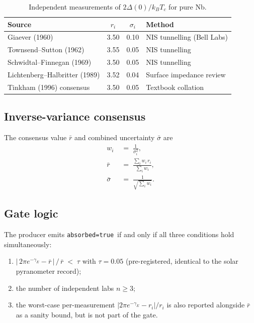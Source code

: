 \documentclass[11pt,a4paper]{article}
\newcommand{\absorbedtrue}{\textcolor{honestgreen}{\texttt{absorbed=true}}}
\begin{document}
\begin{table}[h]
\centering
\caption{Independent measurements of \(2\Delta(0)/k_{B}T_{c}\) for pure Nb.}
\label{tab:nb-measurements}
\begin{tabular}{lccl}
\toprule
Source & \(r_{i}\) & \(\sigma_{i}\) & Method \\
\midrule
Giaever (1960) \cite{giaever1960}        & 3.50 & 0.10 & NIS tunnelling (Bell Labs) \\
Townsend--Sutton (1962) \cite{townsend1962} & 3.55 & 0.05 & NIS tunnelling \\
Schwidtal--Finnegan (1969) \cite{schwidtal1969} & 3.50 & 0.05 & NIS tunnelling \\
Lichtenberg--Halbritter (1989) \cite{lichtenberg1989} & 3.52 & 0.04 & Surface impedance review \\
Tinkham (1996) consensus \cite{tinkham1996} & 3.50 & 0.05 & Textbook collation \\
\bottomrule
\end{tabular}
\end{table}

\subsection{Inverse-variance consensus}

The consensus value \(\bar{r}\) and combined uncertainty \(\bar{\sigma}\) are
\begin{align}
w_{i} \;&=\; \frac{1}{\sigma_{i}^{2}}, \\
\bar{r} \;&=\; \frac{\sum_{i} w_{i}\, r_{i}}{\sum_{i} w_{i}}, \\
\bar{\sigma} \;&=\; \frac{1}{\sqrt{\sum_{i} w_{i}}}.
\end{align}

\subsection{Gate logic}

The producer emits \absorbedtrue\ if and only if all three
conditions hold simultaneously:
\begin{enumerate}
\item \(\bigl|\,2\pi e^{-\gamma_{E}} - \bar{r}\,\bigr| \,/\, \bar{r}
  \;<\; \tau\) with \(\tau = 0.05\) (pre-registered, identical to
  the solar pyranometer record);
\item the number of independent labs \(n \ge 3\);
\item the worst-case per-measurement \(|2\pi e^{-\gamma_{E}} - r_{i}|/r_{i}\)
  is also reported alongside \(\bar{r}\) as a sanity bound, but is
  not part of the gate.
\end{enumerate}
\end{document}
